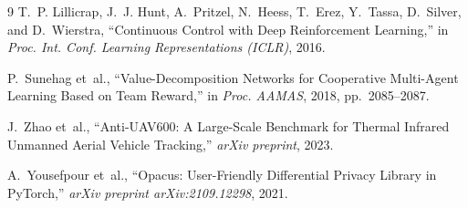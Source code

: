 \begin{thebibliography}{9}
T.~P. Lillicrap, J.~J. Hunt, A.~Pritzel, N.~Heess, T.~Erez, Y.~Tassa,
D.~Silver, and D.~Wierstra,
``Continuous Control with Deep Reinforcement Learning,''
in \emph{Proc. Int. Conf. Learning Representations (ICLR)}, 2016.

P.~Sunehag et~al.,
``Value-Decomposition Networks for Cooperative Multi-Agent Learning Based on
Team Reward,''
in \emph{Proc. AAMAS}, 2018, pp.~2085--2087.

J.~Zhao et~al.,
``Anti-UAV600: A Large-Scale Benchmark for Thermal Infrared Unmanned Aerial
Vehicle Tracking,''
\emph{arXiv preprint}, 2023.

A.~Yousefpour et~al.,
``Opacus: User-Friendly Differential Privacy Library in PyTorch,''
\emph{arXiv preprint arXiv:2109.12298}, 2021.

\end{thebibliography}
